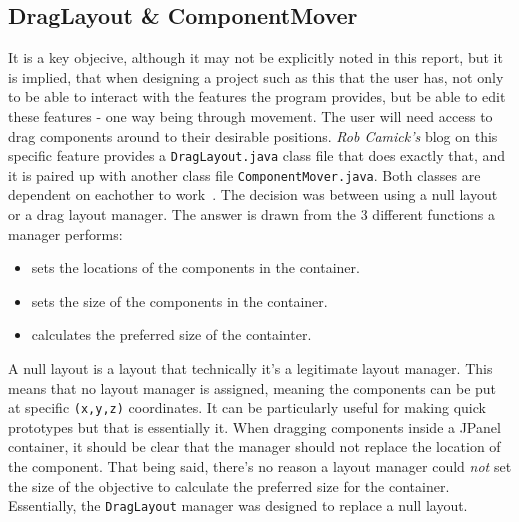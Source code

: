 \documentclass[a4paper, 12pt]{article}
\begin{document}
        \subsection{DragLayout \& ComponentMover}
            It is a key objecive, although it may not be explicitly noted in this report, but
            it is implied, that when designing a project such as this that the user has, not only
            to be able to interact with the features the program provides, but be able to edit these
            features - one way being through movement. The user will need access to drag
            components around to their desirable positions. \textit{Rob Camick's} blog on this specific
            feature provides a \texttt{DragLayout.java} class file that does exactly that, and it is
            paired up with another class file \texttt{ComponentMover.java}. Both classes are dependent
            on eachother to work~\cite{dragLayout}. The decision was between using a null layout or a drag layout manager.
            The answer is drawn from the 3 different functions a manager performs:

            \begin{itemize}
                \item sets the locations of the components in the container.
                \item sets the size of the components in the container.
                \item calculates the preferred size of the containter.
            \end{itemize}

            A null layout is a layout that technically it's a legitimate layout manager. This means that
            no layout manager is assigned, meaning the components can be put at specific \texttt{(x,y,z)}
            coordinates. It can be particularly useful for making quick prototypes but that is essentially it.
            When dragging components inside a JPanel container, it should be clear that the manager
            should not replace the location of the component. That being said, there's no reason a layout
            manager could \textit{not} set the size of the objective to calculate the preferred size
            for the container. Essentially, the \texttt{DragLayout} manager was designed to replace
            a null layout. \\
            
\end{document}

